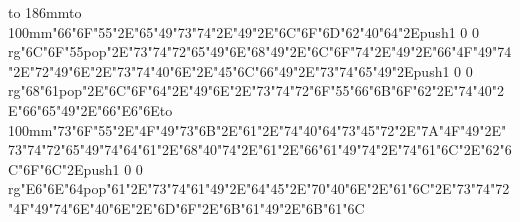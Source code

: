 \hbox to 186mm{\hsize=81mm\vbox to 100mm{\vfill\ipa\char"66\ipa\char"6F\ipa\char"55\ipa\char"2E\ipa\char"65\ipa\char"49\ipa\char"73\ipa\char"74\ipa\char"2E\ipa\char"49\ipa\char"2E\ipa\char"6C\ipa\char"6F\ipa\char"6D\medskip\ipa\char"62\ipa\char"40\ipa\char"64\ipa\char"2E\pdfcolorstack\match push{1 0 0 rg}\ipa\char"6C\ipa\char"6F\ipa\char"55\pdfcolorstack\match pop{}\ipa\char"2E\ipa\char"73\ipa\char"74\ipa\char"72\ipa\char"65\ipa\char"49\ipa\char"6E\medskip\ipa\char"68\ipa\char"49\ipa\char"2E\ipa\char"6C\ipa\char"6F\ipa\char"74\ipa\char"2E\ipa\char"49\ipa\char"2E\ipa\char"66\ipa\char"4F\ipa\char"49\ipa\char"74\ipa\char"2E\ipa\char"72\ipa\char"49\ipa\char"6E\ipa\char"2E\ipa\char"73\ipa\char"74\ipa\char"40\ipa\char"6E\ipa\char"2E\ipa\char"45\ipa\char"6C\ipa\char"66\medskip\ipa\char"49\ipa\char"2E\ipa\char"73\ipa\char"74\ipa\char"65\ipa\char"49\ipa\char"2E\pdfcolorstack\match push{1 0 0 rg}\ipa\char"68\ipa\char"61\pdfcolorstack\match pop{}\ipa\char"2E\ipa\char"6C\ipa\char"6F\ipa\char"64\ipa\char"2E\ipa\char"49\ipa\char"6E\ipa\char"2E\ipa\char"73\ipa\char"74\ipa\char"72\ipa\char"6F\ipa\char"55\ipa\char"66\medskip\ipa\char"6B\ipa\char"6F\ipa\char"62\ipa\char"2E\ipa\char"74\ipa\char"40\ipa\char"2E\ipa\char"66\ipa\char"65\ipa\char"49\ipa\char"2E\ipa\char"66\ipa\char"E6\ipa\char"6E\vfill}\hfill\vbox to 100mm{\vfill\ipa\char"73\ipa\char"6F\ipa\char"55\ipa\char"2E\ipa\char"4F\ipa\char"49\ipa\char"73\ipa\char"6B\ipa\char"2E\ipa\char"61\ipa\char"2E\ipa\char"74\ipa\char"40\ipa\char"64\medskip\ipa\char"73\ipa\char"45\ipa\char"72\ipa\char"2E\ipa\char"7A\ipa\char"4F\ipa\char"49\ipa\char"2E\ipa\char"73\ipa\char"74\ipa\char"72\ipa\char"65\ipa\char"49\ipa\char"74\medskip\ipa\char"64\ipa\char"61\ipa\char"2E\ipa\char"68\ipa\char"40\ipa\char"74\ipa\char"2E\ipa\char"61\ipa\char"2E\ipa\char"66\ipa\char"61\ipa\char"49\ipa\char"74\ipa\char"2E\ipa\char"74\ipa\char"61\ipa\char"6C\ipa\char"2E\ipa\char"62\ipa\char"6C\ipa\char"6F\ipa\char"6C\ipa\char"2E\pdfcolorstack\match push{1 0 0 rg}\ipa\char"E6\ipa\char"6E\ipa\char"64\pdfcolorstack\match pop{}\medskip\ipa\char"61\ipa\char"2E\ipa\char"73\ipa\char"74\ipa\char"61\ipa\char"49\ipa\char"2E\ipa\char"64\ipa\char"45\ipa\char"2E\ipa\char"70\ipa\char"40\ipa\char"6E\ipa\char"2E\ipa\char"61\ipa\char"6C\ipa\char"2E\ipa\char"73\ipa\char"74\ipa\char"72\ipa\char"4F\ipa\char"49\ipa\char"74\medskip\ipa\char"6E\ipa\char"40\ipa\char"6E\ipa\char"2E\ipa\char"6D\ipa\char"6F\ipa\char"2E\ipa\char"6B\ipa\char"61\ipa\char"49\ipa\char"2E\ipa\char"6B\ipa\char"61\ipa\char"6C\vfill}}\eject
